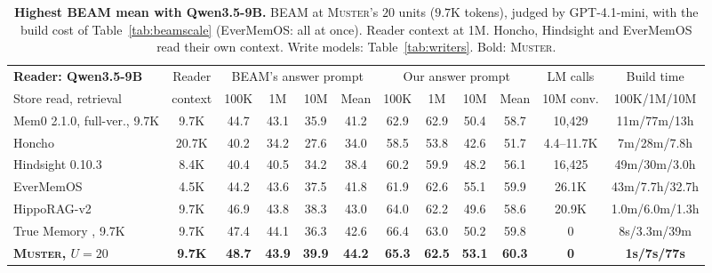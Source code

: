 \documentclass{article}
\newcommand{\ours}{\rowcolor{oursbg}}
\newcommand{\tabfont}{\fontsize{7.5}{8.5}\selectfont\renewcommand{\arraystretch}{1.0}}
\newcommand{\sys}{\textsc{Muster}}
\begin{document}
\begin{table}[t]
\centering\tabfont
\caption{\textbf{Highest BEAM mean with Qwen3.5-9B.} BEAM \cite{beam} at \sys{}'s $20$ units ($9.7$K tokens), judged by GPT-4.1-mini, with the build cost of Table~\ref{tab:beamscale} (EverMemOS: all at once). Reader context at 1M. Honcho, Hindsight and EverMemOS read their own context. Write models: Table~\ref{tab:writers}. Bold: \sys{}.}
\label{tab:samebudget}
\setlength{\tabcolsep}{3pt}
\begin{tabular}{lc cccc cccc cc}
\toprule
\textbf{Reader: Qwen3.5-9B}~\cite{qwen35} & Reader & \multicolumn{4}{c}{BEAM's answer prompt} & \multicolumn{4}{c}{Our answer prompt} & LM calls & Build time \\
\cmidrule(lr){3-6}\cmidrule(lr){7-10}
Store read, retrieval & context & 100K & 1M & 10M & Mean & 100K & 1M & 10M & Mean & 10M conv. & 100K/1M/10M \\
\midrule
Mem0 2.1.0, full-ver., 9.7K \cite{mem0oss} & 9.7K & 44.7 & 43.1 & 35.9 & 41.2 & 62.9 & 62.9 & 50.4 & 58.7 & 10{,}429 & 11m/77m/13h \\
Honcho \cite{honcho} & 20.7K & 40.2 & 34.2 & 27.6 & 34.0 & 58.5 & 53.8 & 42.6 & 51.7 & 4.4--11.7K & 7m/28m/7.8h \\
Hindsight 0.10.3 \cite{hindsight} & 8.4K & 40.4 & 40.5 & 34.2 & 38.4 & 60.2 & 59.9 & 48.2 & 56.1 & 16{,}425 & 49m/30m/3.0h \\
EverMemOS \cite{evermemos} & 4.5K & 44.2 & 43.6 & 37.5 & 41.8 & 61.9 & 62.6 & 55.1 & 59.9 & 26.1K & 43m/7.7h/32.7h \\
\addlinespace[2pt]
HippoRAG-v2 \cite{hipporag2} & 9.7K & 46.9 & 43.8 & 38.3 & 43.0 & 64.0 & 62.2 & 49.6 & 58.6 & 20.9K & 1.0m/6.0m/1.3h \\
\midrule
True Memory \cite{truememory}, 9.7K & 9.7K & 47.4 & 44.1 & 36.3 & 42.6 & 66.4 & 63.0 & 50.2 & 59.8 & 0 & 8s/3.3m/39m \\
\addlinespace[2pt]
\ours \textbf{\sys{}, $U{=}20$} & \textbf{9.7K} & \textbf{48.7} & \textbf{43.9} & \textbf{39.9} & \textbf{44.2} & \textbf{65.3} & \textbf{62.5} & \textbf{53.1} & \textbf{60.3} & \textbf{0} & \textbf{1s/7s/77s} \\
\bottomrule
\end{tabular}
\end{table}
\end{document}
